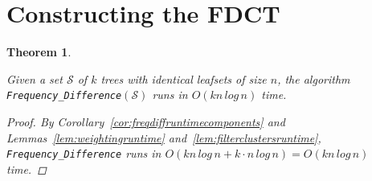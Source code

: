 \documentclass{article}
\newcommand{\leafset}{\Lambda}
\newtheorem{freqdiffruntime}[incompatibility]{Theorem}
\begin{document}
%
%

    \section{Constructing the FDCT}
    \label{sec:freqdiffconstruction}

    \begin{freqdiffruntime}
        \label{theorem:freqdiffruntime}

        Given a set $\mathcal{S}$ of $k$ trees with identical leafsets of size $n$, the algorithm \texttt{Frequency\_Difference}$(\mathcal{S})$ runs in $O(kn\,log\,n)$ time.

        \begin{proof}
            By Corollary~\ref{cor:freqdiffruntimecomponents} and Lemmas~\ref{lem:weightingruntime} and~\ref{lem:filterclustersruntime}, \texttt{Frequency\_Difference} runs in $O(kn\,log\,n + k \cdot n\,log\,n) = O(kn\,log\,n)$ time.
        \end{proof}
    \end{freqdiffruntime}

    \newpage
    
    
\end{document}
